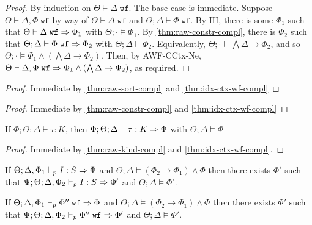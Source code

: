 \idxctxwfcompl*
\begin{proof}
By induction on $\Theta \vdash \Delta \; \texttt{wf}$. The base case is immediate.
Suppose $\Theta \vdash \Delta,\Phi \; \texttt{wf}$ by way of $\Theta \vdash \Delta \; \texttt{wf}$ and $\Theta ; \Delta \vdash \Phi \; \texttt{wf}$.
By IH, there is some $\Phi_1$ such that $\Theta \vdash \Delta \; \texttt{wf} \Rightarrow \Phi_1$ with $\Theta ; \cdot \vDash \Phi_1$. By \autoref{thm:raw-constr-compl}, there is $\Phi_2$ such that $\Theta ; \Delta \vdash \Phi \; \texttt{wf} \Rightarrow \Phi_2$ with $\Theta ; \Delta \vDash \Phi_2$. Equivalently, $\Theta ; \cdot \vDash \bigwedge \Delta \to \Phi_2$, and so $\Theta ; \cdot \vDash \Phi_1 \wedge (\bigwedge \Delta \to \Phi_2)$. Then, by AWF-CCtx-Ne, $\Theta \vdash \Delta,\Phi \; \texttt{wf} \Rightarrow \Phi_1 \wedge (\bigwedge \Delta \to \Phi_2)$, as required.
\end{proof}

\sortcompl*
\begin{proof}
Immediate by \autoref{thm:raw-sort-compl} and \autoref{thm:idx-ctx-wf-compl}
\end{proof}

\constrcompl*
\begin{proof}
Immediate by \autoref{thm:raw-constr-compl} and \autoref{thm:idx-ctx-wf-compl}
\end{proof}

\begin{theorem}
If $\Phi;\Theta;\Delta \vdash \tau : K$, then $\Phi;\Theta;\Delta \vdash \tau : K \Rightarrow \Phi$ with $\Theta ; \Delta \vDash \Phi$
\label{thm:raw-kind-compl}
\end{theorem}

\kindcompl*
\begin{proof}
Immediate by \autoref{thm:raw-kind-compl} and \autoref{thm:idx-ctx-wf-compl}.
\end{proof}

\begin{theorem}
If $\Theta ; \Delta, \Phi_1 \vdash_p I : S \Rightarrow \Phi$ and $\Theta ; \Delta \vDash (\Phi_2 \to \Phi_1) \wedge \Phi$ then there exists $\Phi'$ such that
$\Psi ; \Theta ; \Delta, \Phi_2 \vdash_p I : S \Rightarrow \Phi'$ and $\Theta ; \Delta \vDash \Phi'$.
\label{thm:kind-assump-precomp}
\end{theorem}

\begin{theorem}
If $\Theta ; \Delta, \Phi_1 \vdash_p \Phi'' \; \texttt{wf} \Rightarrow \Phi$ and $\Theta ; \Delta \vDash (\Phi_2 \to \Phi_1) \wedge \Phi$ then there exists $\Phi'$ such that
$\Psi ; \Theta ; \Delta, \Phi_2 \vdash_p \Phi'' \; \texttt{wf} \Rightarrow \Phi'$ and $\Theta ; \Delta \vDash \Phi'$.
\label{thm:kind-assump-precomp}
\end{theorem}

